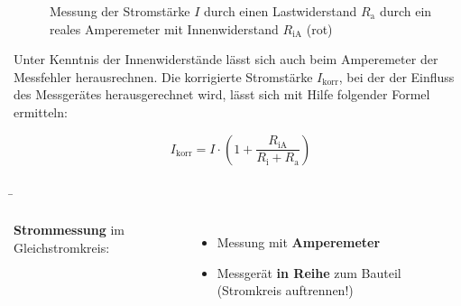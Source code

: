 \begin{frame}
{	\begin{figure}[ht]
		\begin{center}


		\end{center}

		\caption{Messung der Stromstärke $I$ durch einen Lastwiderstand $R_\mathrm{a}$ durch ein
		reales Amperemeter mit Innenwiderstand $R_\mathrm{iA}$ (rot)\label{fig:amperemeterreal}}

	\end{figure}

	Unter Kenntnis der Innenwiderstände lässt sich auch beim Amperemeter der Messfehler herausrechnen.
	Die korrigierte Stromstärke $I_\mathrm{korr}$, bei der der Einfluss des Messgerätes herausgerechnet wird,
	lässt sich mit Hilfe folgender Formel ermitteln:

	\begin{equation*}
		I_{\mathrm{korr}}= I\cdot\left(1+\frac{R_{\mathrm{iA}}}{R_{\mathrm{i}}+R_{\mathrm{a}}}\right)
	\end{equation*}



	}

	\b{

	\begin{columns}
		\textbf{Strommessung} im Gleichstromkreis:
		\begin{itemize}
			\item Messung mit \textbf{Amperemeter}
			\item Messgerät \textbf{in Reihe} zum Bauteil (Stromkreis auftrennen!)
\end{itemize}
\end{columns}}
\end{frame}
